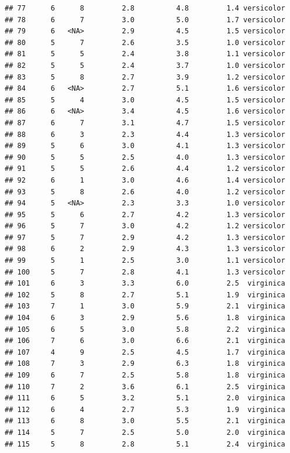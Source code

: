\documentclass[]{book}
\theoremstyle{definition}
\theoremstyle{definition}
\theoremstyle{definition}
\theoremstyle{remark}
\begin{document}
\begin{verbatim}
## 77      6      8         2.8          4.8         1.4 versicolor
## 78      6      7         3.0          5.0         1.7 versicolor
## 79      6   <NA>         2.9          4.5         1.5 versicolor
## 80      5      7         2.6          3.5         1.0 versicolor
## 81      5      5         2.4          3.8         1.1 versicolor
## 82      5      5         2.4          3.7         1.0 versicolor
## 83      5      8         2.7          3.9         1.2 versicolor
## 84      6   <NA>         2.7          5.1         1.6 versicolor
## 85      5      4         3.0          4.5         1.5 versicolor
## 86      6   <NA>         3.4          4.5         1.6 versicolor
## 87      6      7         3.1          4.7         1.5 versicolor
## 88      6      3         2.3          4.4         1.3 versicolor
## 89      5      6         3.0          4.1         1.3 versicolor
## 90      5      5         2.5          4.0         1.3 versicolor
## 91      5      5         2.6          4.4         1.2 versicolor
## 92      6      1         3.0          4.6         1.4 versicolor
## 93      5      8         2.6          4.0         1.2 versicolor
## 94      5   <NA>         2.3          3.3         1.0 versicolor
## 95      5      6         2.7          4.2         1.3 versicolor
## 96      5      7         3.0          4.2         1.2 versicolor
## 97      5      7         2.9          4.2         1.3 versicolor
## 98      6      2         2.9          4.3         1.3 versicolor
## 99      5      1         2.5          3.0         1.1 versicolor
## 100     5      7         2.8          4.1         1.3 versicolor
## 101     6      3         3.3          6.0         2.5  virginica
## 102     5      8         2.7          5.1         1.9  virginica
## 103     7      1         3.0          5.9         2.1  virginica
## 104     6      3         2.9          5.6         1.8  virginica
## 105     6      5         3.0          5.8         2.2  virginica
## 106     7      6         3.0          6.6         2.1  virginica
## 107     4      9         2.5          4.5         1.7  virginica
## 108     7      3         2.9          6.3         1.8  virginica
## 109     6      7         2.5          5.8         1.8  virginica
## 110     7      2         3.6          6.1         2.5  virginica
## 111     6      5         3.2          5.1         2.0  virginica
## 112     6      4         2.7          5.3         1.9  virginica
## 113     6      8         3.0          5.5         2.1  virginica
## 114     5      7         2.5          5.0         2.0  virginica
## 115     5      8         2.8          5.1         2.4  virginica

\end{verbatim}
\end{document}
